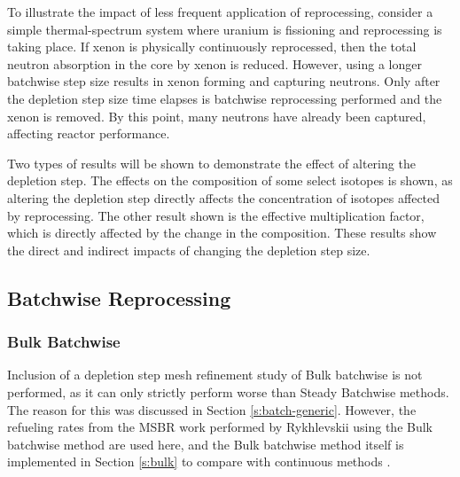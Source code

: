 To illustrate the impact of less frequent application of reprocessing, consider a simple thermal-spectrum system where uranium is fissioning and reprocessing is taking place.
If xenon is physically continuously reprocessed, then the total neutron absorption in the core by xenon is reduced.
However, using a longer batchwise step size results in xenon forming and capturing neutrons.
Only after the depletion step size time elapses is batchwise reprocessing performed and the xenon is removed.
By this point, many neutrons have already been captured, affecting reactor performance.

Two types of results will be shown to demonstrate the effect of altering the depletion step.
The effects on the composition of some select isotopes is shown, as altering the depletion step directly affects the concentration of isotopes affected by reprocessing.
The other result shown is the effective multiplication factor, which is directly affected by the change in the composition.
These results show the direct and indirect impacts of changing the depletion step size.

\subsection{Batchwise Reprocessing}

\subsubsection{Bulk Batchwise}

Inclusion of a depletion step mesh refinement study of Bulk batchwise is not performed, as it can only strictly perform worse than Steady Batchwise methods.
The reason for this was discussed in Section \ref{s:batch-generic}.
However, the refueling rates from the MSBR work performed by Rykhlevskii using the Bulk batchwise method are used here, and the Bulk batchwise method itself is implemented in Section \ref{s:bulk} to compare with continuous methods \cite{rykhlevskii_advanced_2018}.

